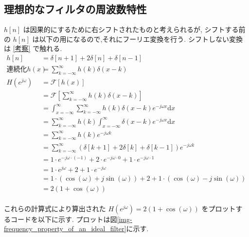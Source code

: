 \documentclass[12pt]{jsarticle}
\begin{document}
      \subsection{理想的なフィルタの周波数特性} \label{理想的なフィルタの周波数特性}
        $h[n]$ は因果的にするために右シフトされたものと考えられるが, シフトする前の $h[n]$ は以下の用になるので,それにフーリエ変換を行う.
        シフトしない変換は \ref{考察} で触れる.
        \begin{align*}
          h [n] &= \delta [n+1] + 2 \delta [n] + \delta [n-1] \\
          \text{連続化} h(x) &= \sum_{k=- \infty}^{\infty} h(k) \delta(x-k)\\
          H(e^{j \omega})
            &= \mathscr{F} \left[ h(x) \right] \\
            &= \mathscr{F} \left[ \sum_{k=- \infty}^{\infty} h(k) \delta(x-k) \right] \\
            &= \int_{x=-\infty}^{\infty} \sum_{k=- \infty}^{\infty} h(k) \delta(x-k) e^{-j \omega x} \mathrm{d} x \\
            &= \sum_{k=- \infty}^{\infty} h(k) \int_{x=-\infty}^{\infty} \delta(x-k) e^{-j \omega x} \mathrm{d} x \\
            &= \sum_{k=- \infty}^{\infty} h(k) e^{-j \omega k} \\
            &= \sum_{k=- \infty}^{\infty} \left( \delta [k+1] + 2 \delta [k] + \delta [k-1] \right) e^{-j \omega k} \\
            &= 1 \cdot e^{-j \omega \cdot (-1)} + 2 \cdot e^{-j \omega \cdot 0} + 1 \cdot e^{-j \omega \cdot 1} \\
            &= 1 \cdot e^{j \omega} + 2 + 1 \cdot e^{-j \omega} \\
            &= 1 \cdot ( \cos (\omega) + j \sin (\omega) ) + 2 + 1 \cdot ( \cos (\omega) - j \sin (\omega) ) \\
            &= 2 (1 + \cos (\omega)) \\
        \end{align*}
        
        これらの計算式により算出された $H(e^{j \omega}) = 2 (1 + \cos (\omega))$ をプロットするコードを以下に示す.
        プロットは図\ref{img-frequency_property_of_an_ideal_filter}に示す.
        
\end{document}
